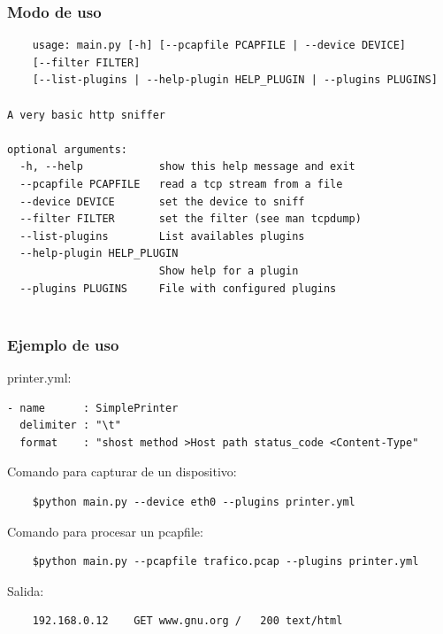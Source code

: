\documentclass[10pt,a4paper]{beamer}
\begin{document}
\begin{frame}[fragile]
	\frametitle{Modo de uso}
	{\small
	\begin{verbatim}
	usage: main.py [-h] [--pcapfile PCAPFILE | --device DEVICE] 
	[--filter FILTER]
	[--list-plugins | --help-plugin HELP_PLUGIN | --plugins PLUGINS]

A very basic http sniffer

optional arguments:
  -h, --help            show this help message and exit
  --pcapfile PCAPFILE   read a tcp stream from a file
  --device DEVICE       set the device to sniff
  --filter FILTER       set the filter (see man tcpdump)
  --list-plugins        List availables plugins
  --help-plugin HELP_PLUGIN
                        Show help for a plugin
  --plugins PLUGINS     File with configured plugins


	\end{verbatim}
	}
\end{frame}

\begin{frame}[fragile]
	\frametitle{Ejemplo de uso}
	printer.yml:
	{\small
	\begin{verbatim}
- name      : SimplePrinter
  delimiter : "\t"
  format    : "shost method >Host path status_code <Content-Type"
    \end{verbatim}
    }
    Comando para capturar de un dispositivo:
    {\small
	\begin{verbatim}
	$python main.py --device eth0 --plugins printer.yml
	\end{verbatim}
	}
    Comando para procesar un pcapfile:
    {\small
	\begin{verbatim}
	$python main.py --pcapfile trafico.pcap --plugins printer.yml
	\end{verbatim}
	}
	Salida:
    {\small
	\begin{verbatim}
	192.168.0.12	GET	www.gnu.org	/	200	text/html
	\end{verbatim}
	}
	    
\end{frame}
\end{document}
